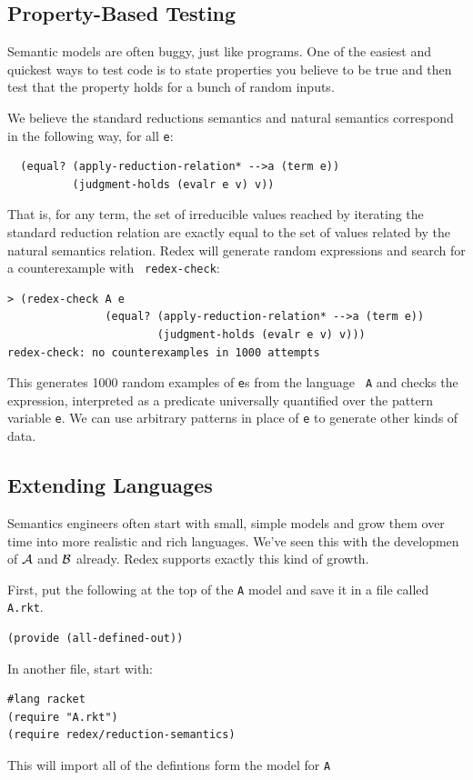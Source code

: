 \subsection{Property-Based Testing}

Semantic models are often buggy, just like programs.  One of the
easiest and quickest ways to test code is to state properties you
believe to be true and then test that the property holds for a bunch
of random inputs.

We believe the standard reductions semantics and natural semantics
correspond in the following way, for all {\tt e}:
\begin{verbatim}
  (equal? (apply-reduction-relation* -->a (term e))
          (judgment-holds (evalr e v) v))
\end{verbatim}
That is, for any term, the set of irreducible values reached by
iterating the standard reduction relation are exactly equal to the set
of values related by the natural semantics relation.  Redex will
generate random expressions and search for a counterexample with {\tt
  redex-check}:
\begin{verbatim}                                                                          
> (redex-check A e
               (equal? (apply-reduction-relation* -->a (term e))
                       (judgment-holds (evalr e v) v)))
redex-check: no counterexamples in 1000 attempts
\end{verbatim}
This generates 1000 random examples of {\tt e}s from the language {\tt
  A} and checks the expression, interpreted as a predicate universally
quantified over the pattern variable {\tt e}.  We can use arbitrary
patterns in place of {\tt e} to generate other kinds of data.

\subsection{Extending Languages}

Semantics engineers often start with small, simple models and grow
them over time into more realistic and rich languages.  We've seen
this with the developmen of $\mathcal{A}$ and $\mathcal{B}$ already.  Redex
supports exactly this kind of growth.

First, put the following at the top of the {\tt A} model and save it
in a file called {\tt A.rkt}.
\begin{verbatim}
(provide (all-defined-out))
\end{verbatim}

In another file, start with:
\begin{verbatim}
#lang racket
(require "A.rkt")
(require redex/reduction-semantics)
\end{verbatim}
This will import all of the defintions form the model for {\tt A}


